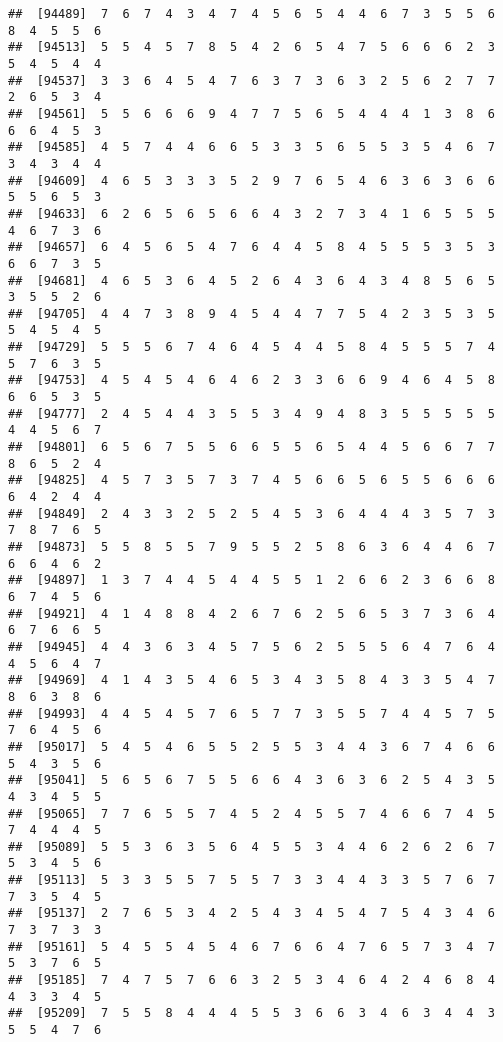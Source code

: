 \documentclass[
]{book}
\begin{document}
\begin{verbatim}
##  [94489]  7  6  7  4  3  4  7  4  5  6  5  4  4  6  7  3  5  5  6  8  4  5  5  6
##  [94513]  5  5  4  5  7  8  5  4  2  6  5  4  7  5  6  6  6  2  3  5  4  5  4  4
##  [94537]  3  3  6  4  5  4  7  6  3  7  3  6  3  2  5  6  2  7  7  2  6  5  3  4
##  [94561]  5  5  6  6  6  9  4  7  7  5  6  5  4  4  4  1  3  8  6  6  6  4  5  3
##  [94585]  4  5  7  4  4  6  6  5  3  3  5  6  5  5  3  5  4  6  7  3  4  3  4  4
##  [94609]  4  6  5  3  3  3  5  2  9  7  6  5  4  6  3  6  3  6  6  5  5  6  5  3
##  [94633]  6  2  6  5  6  5  6  6  4  3  2  7  3  4  1  6  5  5  5  4  6  7  3  6
##  [94657]  6  4  5  6  5  4  7  6  4  4  5  8  4  5  5  5  3  5  3  6  6  7  3  5
##  [94681]  4  6  5  3  6  4  5  2  6  4  3  6  4  3  4  8  5  6  5  3  5  5  2  6
##  [94705]  4  4  7  3  8  9  4  5  4  4  7  7  5  4  2  3  5  3  5  5  4  5  4  5
##  [94729]  5  5  5  6  7  4  6  4  5  4  4  5  8  4  5  5  5  7  4  5  7  6  3  5
##  [94753]  4  5  4  5  4  6  4  6  2  3  3  6  6  9  4  6  4  5  8  6  6  5  3  5
##  [94777]  2  4  5  4  4  3  5  5  3  4  9  4  8  3  5  5  5  5  5  4  4  5  6  7
##  [94801]  6  5  6  7  5  5  6  6  5  5  6  5  4  4  5  6  6  7  7  8  6  5  2  4
##  [94825]  4  5  7  3  5  7  3  7  4  5  6  6  5  6  5  5  6  6  6  6  4  2  4  4
##  [94849]  2  4  3  3  2  5  2  5  4  5  3  6  4  4  4  3  5  7  3  7  8  7  6  5
##  [94873]  5  5  8  5  5  7  9  5  5  2  5  8  6  3  6  4  4  6  7  6  6  4  6  2
##  [94897]  1  3  7  4  4  5  4  4  5  5  1  2  6  6  2  3  6  6  8  6  7  4  5  6
##  [94921]  4  1  4  8  8  4  2  6  7  6  2  5  6  5  3  7  3  6  4  6  7  6  6  5
##  [94945]  4  4  3  6  3  4  5  7  5  6  2  5  5  5  6  4  7  6  4  4  5  6  4  7
##  [94969]  4  1  4  3  5  4  6  5  3  4  3  5  8  4  3  3  5  4  7  8  6  3  8  6
##  [94993]  4  4  5  4  5  7  6  5  7  7  3  5  5  7  4  4  5  7  5  7  6  4  5  6
##  [95017]  5  4  5  4  6  5  5  2  5  5  3  4  4  3  6  7  4  6  6  5  4  3  5  6
##  [95041]  5  6  5  6  7  5  5  6  6  4  3  6  3  6  2  5  4  3  5  4  3  4  5  5
##  [95065]  7  7  6  5  5  7  4  5  2  4  5  5  7  4  6  6  7  4  5  7  4  4  4  5
##  [95089]  5  5  3  6  3  5  6  4  5  5  3  4  4  6  2  6  2  6  7  5  3  4  5  6
##  [95113]  5  3  3  5  5  7  5  5  7  3  3  4  4  3  3  5  7  6  7  7  3  5  4  5
##  [95137]  2  7  6  5  3  4  2  5  4  3  4  5  4  7  5  4  3  4  6  7  3  7  3  3
##  [95161]  5  4  5  5  4  5  4  6  7  6  6  4  7  6  5  7  3  4  7  5  3  7  6  5
##  [95185]  7  4  7  5  7  6  6  3  2  5  3  4  6  4  2  4  6  8  4  4  3  3  4  5
##  [95209]  7  5  5  8  4  4  4  5  5  3  6  6  3  4  6  3  4  4  3  5  5  4  7  6

\end{verbatim}
\end{document}
